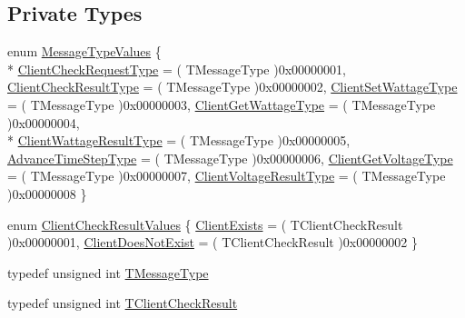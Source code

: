 \subsection*{Private Types}
\begin{DoxyCompactItemize}
\item 
enum \hyperlink{class_matlab_manager_afc23406cdfc3be02850cb0ebfff31667}{Message\-Type\-Values} \{ \\*
\hyperlink{class_matlab_manager_afc23406cdfc3be02850cb0ebfff31667adcbf0e0a9cff329e02fee0497abfa0ad}{Client\-Check\-Request\-Type} = ( T\-Message\-Type )0x00000001, 
\hyperlink{class_matlab_manager_afc23406cdfc3be02850cb0ebfff31667a6de37f5f7bc415439f9bfac3d388134e}{Client\-Check\-Result\-Type} = ( T\-Message\-Type )0x00000002, 
\hyperlink{class_matlab_manager_afc23406cdfc3be02850cb0ebfff31667acb00c176bba6ee9a2fba061b06b66d51}{Client\-Set\-Wattage\-Type} = ( T\-Message\-Type )0x00000003, 
\hyperlink{class_matlab_manager_afc23406cdfc3be02850cb0ebfff31667a48753b1473148776d411382a2a691da3}{Client\-Get\-Wattage\-Type} = ( T\-Message\-Type )0x00000004, 
\\*
\hyperlink{class_matlab_manager_afc23406cdfc3be02850cb0ebfff31667abc777d9922513b94f1cf1541a83ada1a}{Client\-Wattage\-Result\-Type} = ( T\-Message\-Type )0x00000005, 
\hyperlink{class_matlab_manager_afc23406cdfc3be02850cb0ebfff31667aa4d88f91b01fbcea0365103defc963f2}{Advance\-Time\-Step\-Type} = ( T\-Message\-Type )0x00000006, 
\hyperlink{class_matlab_manager_afc23406cdfc3be02850cb0ebfff31667a665fee7de60985960737ee5508d8c3ca}{Client\-Get\-Voltage\-Type} = ( T\-Message\-Type )0x00000007, 
\hyperlink{class_matlab_manager_afc23406cdfc3be02850cb0ebfff31667aaead7562933ee6468343ba41654b2c18}{Client\-Voltage\-Result\-Type} = ( T\-Message\-Type )0x00000008
 \}
\item 
enum \hyperlink{class_matlab_manager_a3030ee8380a9c54563d3ba494b2ac5bd}{Client\-Check\-Result\-Values} \{ \hyperlink{class_matlab_manager_a3030ee8380a9c54563d3ba494b2ac5bdaee007d7e72b359f645f0f48f11270826}{Client\-Exists} = ( T\-Client\-Check\-Result )0x00000001, 
\hyperlink{class_matlab_manager_a3030ee8380a9c54563d3ba494b2ac5bda55075a8cc68c810028c410f20517f381}{Client\-Does\-Not\-Exist} = ( T\-Client\-Check\-Result )0x00000002
 \}
\item 
typedef unsigned int \hyperlink{class_matlab_manager_a36ad68398613c0d0ede6077af22d830c}{T\-Message\-Type}
\item 
typedef unsigned int \hyperlink{class_matlab_manager_ac04dd0e7a4ab2efafe9604da5d44b318}{T\-Client\-Check\-Result}
\end{DoxyCompactItemize}
